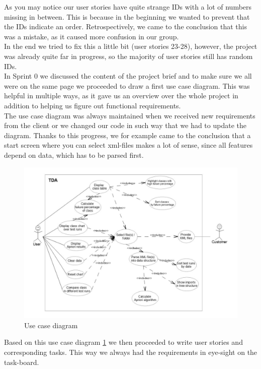 As you may notice our user stories have quite strange IDs with a lot of numbers missing in between. This is because in the beginning we wanted to prevent that the IDs indicate an order. Retrospectively, we came to the conclusion that this was a mistake, as it caused more confusion in our group.\\
In the end we tried to fix this a little bit (user stories 23-28), however, the project was already quite far in progress, so the majority of user stories still has random IDs.  \\
\newline
In Sprint 0 we discussed the content of the project brief and to make sure we all were on the same page we proceeded to draw a first use case diagram. This was helpful in multiple ways, as it gave us an overview over the whole project in addition to helping us figure out functional requirements.\\
The use case diagram was always maintained when we received new requirements from the client or we changed our code in such way that we had to update the diagram. Thanks to this progress, we for example came to the conclusion that a start screen where you can select xml-files makes a lot of sense, since all features depend on data, which has to be parsed first.

\begin{figure}
	\begin{center}
		\includegraphics[scale=0.6]{pics/UseCaseDiagram.jpg}
		\caption{Use case diagram}
		\label{use-case}
	\end{center}	
\end{figure}
Based on this use case diagram \ref{use-case} we then proceeded to write user stories and corresponding tasks. This way we always had the requirements in eye-sight on the task-board.

